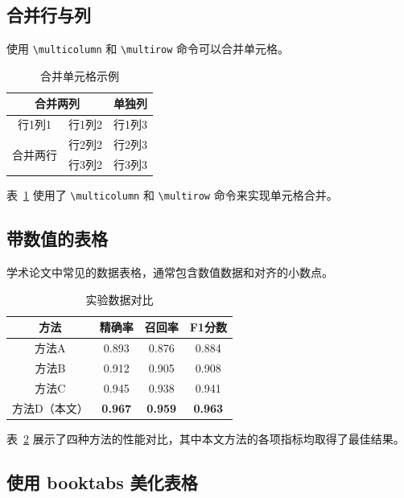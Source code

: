 \subsection{合并行与列}%
\label{subsec:merge}

使用 \texttt{\textbackslash multicolumn} 和 \texttt{\textbackslash multirow} 命令可以合并单元格。

\begin{table}[ht]
\centering
\caption{合并单元格示例}%
\label{tab:merge}
\begin{tabular}{|c|c|c|}
\hline
\multicolumn{2}{|c|}{\textbf{合并两列}} & \textbf{单独列} \\
\hline
行1列1 & 行1列2 & 行1列3 \\
\hline
\multirow{2}{*}{合并两行} & 行2列2 & 行2列3 \\
\cline{2-3}
 & 行3列2 & 行3列3 \\
\hline
\end{tabular}
\end{table}

表~\ref{tab:merge} 使用了 \texttt{\textbackslash multicolumn} 和 \texttt{\textbackslash multirow} 命令来实现单元格合并。

\subsection{带数值的表格}%
\label{subsec:data-table}

学术论文中常见的数据表格，通常包含数值数据和对齐的小数点。

\begin{table}[ht]
\centering
\caption{实验数据对比}%
\label{tab:data}
\begin{tabular}{|c|c|c|c|}
\hline
\textbf{方法} & \textbf{精确率} & \textbf{召回率} & \textbf{F1分数} \\
\hline
方法A & 0.893 & 0.876 & 0.884 \\
方法B & 0.912 & 0.905 & 0.908 \\
方法C & 0.945 & 0.938 & 0.941 \\
方法D（本文） & \textbf{0.967} & \textbf{0.959} & \textbf{0.963} \\
\hline
\end{tabular}
\end{table}

表~\ref{tab:data} 展示了四种方法的性能对比，其中本文方法的各项指标均取得了最佳结果。

\subsection{使用 booktabs 美化表格}%
\label{subsec:booktabs}

